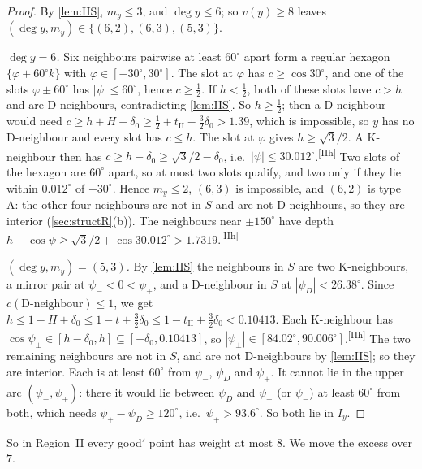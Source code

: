 \documentclass[11pt]{amsart}
\theoremstyle{definition}
\theoremstyle{remark}
\newcommand{\chk}[1]{\textsuperscript{[#1]}}
\begin{document}
\begin{proof}
By \cref{lem:IIS}, $m_y\le3$, and $\deg y\le6$; so $v(y)\ge8$ leaves $(\deg y,m_y)\in\{(6,2),(6,3),(5,3)\}$.

\emph{$\deg y=6$.} Six neighbours pairwise at least $60^\circ$ apart form a regular hexagon $\{\varphi+60^\circ k\}$ with $\varphi\in[-30^\circ,30^\circ]$. The slot at $\varphi$ has $c\ge\cos30^\circ$, and one of the slots $\varphi\pm60^\circ$ has $|\psi|\le60^\circ$, hence $c\ge\frac12$. If $h<\frac12$, both of these slots have $c>h$ and are D-neighbours, contradicting \cref{lem:IIS}. So $h\ge\frac12$; then a D-neighbour would need $c\ge h+H-\delta_0\ge\frac12+t_{\mathrm{II}}-\frac32\delta_0>1.39$, which is impossible, so $y$ has no D-neighbour and every slot has $c\le h$. The slot at $\varphi$ gives $h\ge\sqrt3/2$. A K-neighbour then has $c\ge h-\delta_0\ge\sqrt3/2-\delta_0$, i.e.\ $|\psi|\le30.012^\circ$.\chk{IIh} Two slots of the hexagon are $60^\circ$ apart, so at most two slots qualify, and two only if they lie within $0.012^\circ$ of $\pm30^\circ$. Hence $m_y\le2$, $(6,3)$ is impossible, and $(6,2)$ is type A: the other four neighbours are not in $S$ and are not D-neighbours, so they are interior (\cref{sec:structR}(b)). The neighbours near $\pm150^\circ$ have depth $h-\cos\psi\ge\sqrt3/2+\cos30.012^\circ>1.7319$.\chk{IIh}

\emph{$(\deg y,m_y)=(5,3)$.} By \cref{lem:IIS} the neighbours in $S$ are two K-neighbours, a mirror pair at $\psi_-<0<\psi_+$, and a D-neighbour in $S$ at $|\psi_D|<26.38^\circ$. Since $c(\text{D-neighbour})\le1$, we get $h\le1-H+\delta_0\le1-t+\frac32\delta_0\le1-t_{\mathrm{II}}+\frac32\delta_0<0.10413$. Each K-neighbour has $\cos\psi_\pm\in[h-\delta_0,h]\subseteq[-\delta_0,0.10413]$, so $|\psi_\pm|\in[84.02^\circ,90.006^\circ]$.\chk{IIh} The two remaining neighbours are not in $S$, and are not D-neighbours by \cref{lem:IIS}; so they are interior. Each is at least $60^\circ$ from $\psi_-$, $\psi_D$ and $\psi_+$. It cannot lie in the upper arc $(\psi_-,\psi_+)$: there it would lie between $\psi_D$ and $\psi_+$ (or $\psi_-$) at least $60^\circ$ from both, which needs $\psi_+-\psi_D\ge120^\circ$, i.e.\ $\psi_+>93.6^\circ$. So both lie in $I_y$.
\end{proof}

So in Region~II every good$'$ point has weight at most $8$. We move the excess over $7$.
\end{document}

